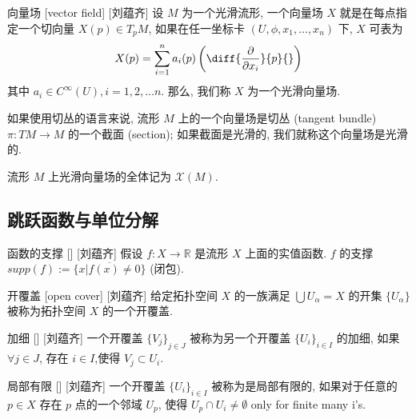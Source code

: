 \documentclass[UTF8]{ctexart}
\begin{document}
        \begin{dfn}
            []
            {向量场}
            [vector field]
            [刘蕴齐]
            设 \(M\) 为一个光滑流形, 一个向量场 \(X\) 就是在每点指定一个切向量 \(X(p) \in T_p M\), 如果在任一坐标卡 \((U,\phi,x_1,\dots,x_n)\) 下,  \(X\) 可表为
            \[
            X(p)=\sum_{i=1}^{n} a_{i}(p)\left(\diff{\frac{\partial}{\partial x_{i}}}{p}{}\right)
            \]
            其中 \(a_i \in C^{\infty}(U), i = 1,2, \dots n\). 那么, 我们称  \(X\)  为一个光滑向量场. 
            
            如果使用切丛的语言来说, 流形 \(M\) 上的一个向量场是切丛 (tangent bundle)  \(\pi: TM \rightarrow M\) 的一个截面 (section); 如果截面是光滑的, 我们就称这个向量场是光滑的. 
            
            流形  \(M\)  上光滑向量场的全体记为 \(\mathcal{X}(M)\).
        \end{dfn}


    \subsection{跳跃函数与单位分解}
    
        \begin{dfn}
            []
            {函数的支撑}
            []
            [刘蕴齐]
            假设 \(f: X \rightarrow \mathbb{R}\)  是流形 \(X\) 上面的实值函数. 
             \(f\)  的支撑  \(supp(f):= \overline{\{ x | f(x) \neq 0 \}}\) (闭包).
        \end{dfn}

        \begin{dfn}
            []
            {开覆盖}
            [open cover]
            [刘蕴齐]
            给定拓扑空间 \(X\) 的一族满足 \(\bigcup U_{\alpha} = X\) 的开集 \(\{U_{\alpha} \}\) 被称为拓扑空间 \(X\) 的一个开覆盖. 
        \end{dfn}

        \begin{dfn}
            []
            {加细}
            []
            [刘蕴齐]
            一个开覆盖 \({\{V_j\}}_{j \in J}\)  被称为另一个开覆盖 \({\{U_i\}}_{i \in I}\) 的加细, 如果  \(\forall j \in J\), 存在 \(i \in I\),使得 \(V_j \subset U_i\). 
        \end{dfn}

        \begin{dfn}
            []
            {局部有限}
            []
            [刘蕴齐]
            一个开覆盖 \({\{U_i\}}_{i \in I}\) 被称为是局部有限的, 如果对于任意的 \(p \in X\) 
            存在 \(p\) 点的一个邻域 \(U_p\), 使得  \(U_p \cap U_i \neq \emptyset\)  only for finite many i's.
        \end{dfn}
\end{document}
